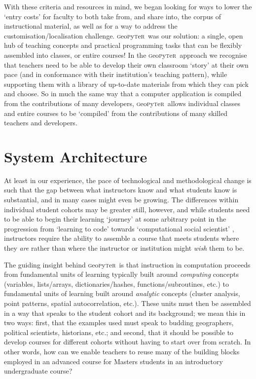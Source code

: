 \documentclass[letter, 11pt]{article}
\newcommand{\gp}{\textsc{g}eo\textsc{p}y\textsc{t}e\textsc{r}~\/}
\begin{document}
With these criteria and resources in mind, we began looking for ways to lower
the `entry costs' for faculty to both take from, and share into, the corpus of
instructional material, as well as for a way to address the
customisation/localisation challenge. \gp was our solution: a single, open hub
of teaching concepts and practical programming tasks that can be flexibly
assembled into classes, or entire courses! In the \gp approach we recognise that
teachers need to be able to develop their own classroom `story' at their own
pace (and in conformance with their institution's teaching pattern), while
supporting them with a library of up-to-date materials from which they can pick
and choose. So in much the same way that a computer application is compiled from
the contributions of many developers, \gp allows individual classes and entire
courses to be `compiled' from the contributions of many skilled teachers and
developers.

\section{System Architecture}\label{system-architecture}

At least in our experience, the pace of technological and methodological change
is such that the gap between what instructors know and what students know is
substantial, and in many cases might even be growing. The differences within
individual student cohorts may be greater still, however, and while students
need to be able to begin their learning `journey' at some arbitrary point in the
progression from `learning to code' towards `computational social scientist'
\citep{Lazer2009}, instructors require the ability to assemble a course that
meets students where they \emph{are} rather than where the instructor or
institution might \emph{wish} them to be.

The guiding insight behind \gp is that instruction in computation proceeds from
fundamental units of learning typically built around \textit{computing} concepts
(variables, lists/arrays, dictionaries/hashes, functions/subroutines, etc.) to
fundamental units of learning built around \textit{analytic} concepts (cluster
analysis, point patterns, spatial autocorrelation, etc.). These units must then
be assembled in a way that speaks to the student cohort and its background; we
mean this in two ways: first, that the examples used must speak to budding
geographers, political scientists, historians, etc.; and second, that it should
be possible to develop courses for different cohorts without having to start
over from scratch. In other words, how can we enable teachers to reuse many of
the building blocks employed in an advanced course for Masters students in an
introductory undergraduate course?
\end{document}
